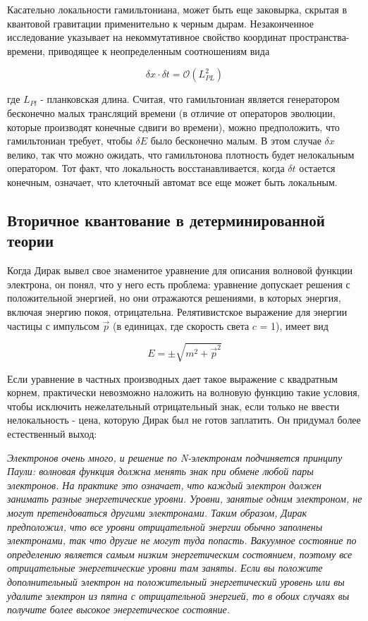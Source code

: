 \documentclass[main.tex]{subfiles}
\begin{document}
Касательно локальности гамильтониана, может быть еще заковырка, скрытая в квантовой гравитации применительно к черным дырам. Незаконченное исследование указывает на некоммутативное свойство координат пространства-времени, приводящее к неопределенным соотношениям вида

\begin{equation}\label{9.6}
	\delta x\cdot \delta t = \mathcal{O}(L^2_{PL})
\end{equation}
           
где $L_{Pl}$ - планковская длина. Считая, что гамильтониан является генератором бесконечно малых трансляций времени (в отличие от операторов эволюции, которые производят конечные сдвиги во времени), можно предположить, что гамильтониан требует, чтобы $\delta E$ было бесконечно малым. В этом случае $\delta x$ велико, так что можно ожидать, что гамильтонова плотность будет нелокальным оператором. Тот факт, что локальность восстанавливается, когда $\delta t$ остается конечным, означает, что клеточный автомат все еще может быть локальным.



\subsection{Вторичное квантование в детерминированной теории}\label{ch9.2}

Когда Дирак вывел свое знаменитое уравнение для описания волновой функции электрона, он понял, что у него есть проблема: уравнение допускает решения с положительной энергией, но они отражаются решениями, в которых энергия, включая энергию покоя, отрицательна. Релятивистское выражение для энергии частицы с импульсом $\vec p$ (в единицах, где скорость света $c$ = 1), имеет вид

\begin{equation}\label{9.7}
	E = \pm \sqrt{m^2 + \vec p^2}
\end{equation}

Если уравнение в частных производных дает такое выражение с квадратным корнем, практически невозможно наложить на волновую функцию такие условия, чтобы исключить нежелательный отрицательный знак, если только не ввести нелокальность - цена, которую Дирак был не готов заплатить. Он придумал более естественный выход:

\textit{Электронов очень много, и решение по N-электронам подчиняется принципу Паули: волновая функция должна менять знак при обмене любой пары электронов. На практике это означает, что каждый электрон должен занимать разные энергетические уровни. Уровни, занятые одним электроном, не могут претендоваться другими электронами. Таким образом, Дирак предположил, что все уровни отрицательной энергии обычно заполнены электронами, так что другие не могут туда попасть. Вакуумное состояние по определению является самым низким энергетическим состоянием, поэтому все отрицательные энергетические уровни там заняты. Если вы положите дополнительный электрон на положительный энергетический уровень или вы удалите электрон из пятна с отрицательной энергией, то в обоих случаях вы получите более высокое энергетическое состояние.}
\end{document}

